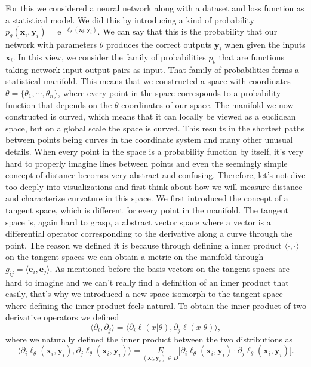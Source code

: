 For this we considered a neural network along with a dataset and loss function as a statistical model. We did this by introducing a kind of probability $p_\theta(\mathbf{x}_i,\mathbf{y}_i) = \mathrm{e}^{-\ell_\theta(\mathbf{x}_i,\mathbf{y}_i)}$. We can say that this is the probability that our network with parameters $\theta$ produces the correct outputs $\mathbf{y}_i$ when given the inputs $\mathbf{x}_i$. In this view, we consider the family of probabilities $p_\theta$ that are functions taking network input-output pairs as input. That family of probabilities forms a statistical manifold. This means that we constructed a space with coordinates $\theta = \{\theta_1, \cdots, \theta_n\}$, where every point in the space corresponds to a probability function that depends on the $\theta$ coordinates of our space. The manifold we now constructed is curved, which means that it can locally be viewed as a euclidean space, but on a global scale the space is curved. This results in the shortest paths between points being curves in the coordinate system and many other unusual details. When every point in the space is a probability function by itself, it's very hard to properly imagine lines between points and even the seemingly simple concept of distance becomes very abstract and confusing. Therefore, let's not dive too deeply into visualizations and first think about how we will measure distance and characterize curvature in this space. We first introduced the concept of a tangent space, which is different for every point in the manifold. The tangent space is, again hard to grasp, a abstract vector space where a vector is a differential operator corresponding to the derivative along a curve through the point. The reason we defined it is because through defining a inner product $\langle \cdot , \cdot \rangle$ on the tangent spaces we can obtain a metric on the manifold through $g_{ij} = \langle \mathbf{e}_i,\mathbf{e}_j\rangle$. As mentioned before the basis vectors on the tangent spaces are hard to imagine and we can't really find a definition of an inner product that easily, that's why we introduced a new space isomorph to the tangent space where defining the inner product feels natural. To obtain the inner product of two derivative operators we defined
\begin{equation}
	\langle \partial_i, \partial_j \rangle = \langle \partial_i \ell(x|\theta), \partial_j \ell(x|\theta) \rangle,
\end{equation}
where we naturally defined the inner product between the two distributions as
\begin{equation}
	 \langle \partial_i \ell_\theta(\mathbf{x}_i,\mathbf{y}_i), \partial_j \ell_\theta(\mathbf{x}_i,\mathbf{y}_i) \rangle = \underset{(\mathbf{x}_i,\mathbf{y}_i)\in D}{E} \big[\partial_i \ell_\theta(\mathbf{x}_i,\mathbf{y}_i) \cdot \partial_j \ell_\theta(\mathbf{x}_i,\mathbf{y}_i)\big].
\end{equation}
